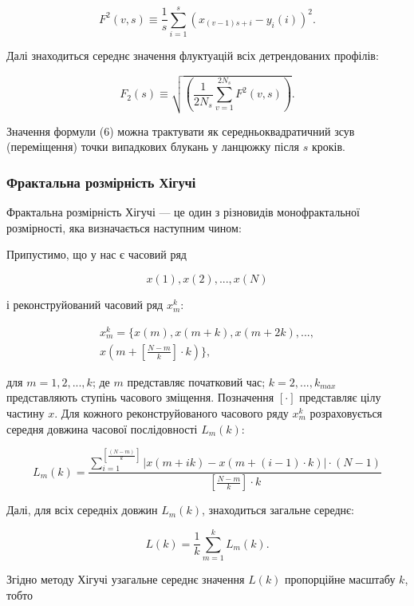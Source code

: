 \documentclass[
  letterpaper,
]{report}
\begin{document}
\[
F^2(v,s) \equiv \frac{1}{s}\sum_{i=1}^{s}\left( x_{(v-1)s+i} - y_{i}(i) \right)^{2}. \tag{5}
\]

Далі знаходиться середнє значення флуктуацій всіх детрендованих
профілів:

\[
F_2(s) \equiv \sqrt{\left( \frac{1}{2N_s} \sum_{v=1}^{2N_s}F^{2}(v,s) \right)}. \tag{6}
\]

Значення формули (6) можна трактувати як середньоквадратичний зсув
(переміщення) точки випадкових блукань у ланцюжку після \(s\) кроків.

\hypertarget{ux444ux440ux430ux43aux442ux430ux43bux44cux43dux430-ux440ux43eux437ux43cux456ux440ux43dux456ux441ux442ux44c-ux445ux456ux433ux443ux447ux456}{%
\subsubsection{Фрактальна розмірність
Хігучі}\label{ux444ux440ux430ux43aux442ux430ux43bux44cux43dux430-ux440ux43eux437ux43cux456ux440ux43dux456ux441ux442ux44c-ux445ux456ux433ux443ux447ux456}}

Фрактальна розмірність Хігучі --- це один з різновидів монофрактальної
розмірності, яка визначається наступним чином:

Припустимо, що у нас є часовий ряд

\[
x(1), x(2),...,x(N)
\]

і реконструйований часовий ряд \(x_{m}^{k}\):

\begin{align*}
x_{m}^{k} = \{ x(m), x(m+k), x(m+2k), ..., \\
 x\left( m+\left[ \frac{N-m}{k} \right] \cdot k \right) \}, 
\end{align*}

для \(m=1,2,...,k\); де \(m\) представляє початковий час;
\(k=2,...,k_{max}\) представляють ступінь часового зміщення. Позначення
\([\cdot]\) представляє цілу частину \(x\). Для кожного
реконструйованого часового ряду \(x_{m}^{k}\) розраховується середня
довжина часової послідовності \(L_{m}(k)\):

\[
L_{m}(k) = \frac{\sum_{i=1}^{[\frac{(N-m)}{k}]} | x(m+ik) - x(m+(i-1)\cdot k) | \cdot (N-1)}{[\frac{N-m}{k}] \cdot k}
\]

Далі, для всіх середніх довжин \(L_{m}(k)\), знаходиться загальне
середнє:

\[
L(k) = \frac{1}{k}\sum_{m=1}^{k}L_{m}(k). 
\]

Згідно методу Хігучі узагальне середнє значення \(L(k)\) пропорційне
масштабу \(k\), тобто
\end{document}
